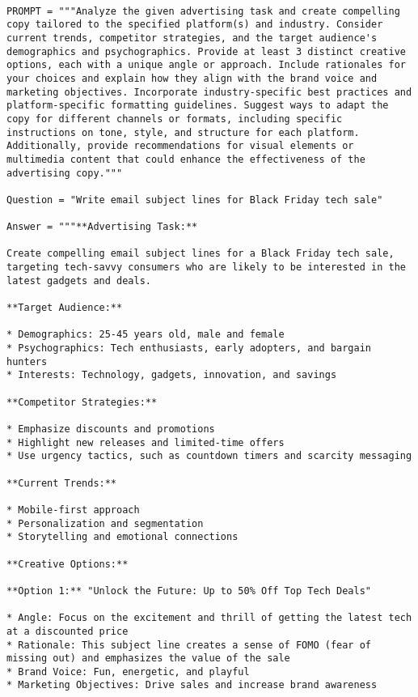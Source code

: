 \begin{tcolorbox}[title={\textbf{\small Performance After Optimization}}, boxrule=2pt, arc=0mm, breakable]
\begin{verbatim}

PROMPT = """Analyze the given advertising task and create compelling copy tailored to the specified platform(s) and industry. Consider current trends, competitor strategies, and the target audience's demographics and psychographics. Provide at least 3 distinct creative options, each with a unique angle or approach. Include rationales for your choices and explain how they align with the brand voice and marketing objectives. Incorporate industry-specific best practices and platform-specific formatting guidelines. Suggest ways to adapt the copy for different channels or formats, including specific instructions on tone, style, and structure for each platform. Additionally, provide recommendations for visual elements or multimedia content that could enhance the effectiveness of the advertising copy."""

Question = "Write email subject lines for Black Friday tech sale"

Answer = """**Advertising Task:**

Create compelling email subject lines for a Black Friday tech sale, targeting tech-savvy consumers who are likely to be interested in the latest gadgets and deals.

**Target Audience:**

* Demographics: 25-45 years old, male and female
* Psychographics: Tech enthusiasts, early adopters, and bargain hunters
* Interests: Technology, gadgets, innovation, and savings

**Competitor Strategies:**

* Emphasize discounts and promotions
* Highlight new releases and limited-time offers
* Use urgency tactics, such as countdown timers and scarcity messaging

**Current Trends:**

* Mobile-first approach
* Personalization and segmentation
* Storytelling and emotional connections

**Creative Options:**

**Option 1:** "Unlock the Future: Up to 50% Off Top Tech Deals"

* Angle: Focus on the excitement and thrill of getting the latest tech at a discounted price
* Rationale: This subject line creates a sense of FOMO (fear of missing out) and emphasizes the value of the sale
* Brand Voice: Fun, energetic, and playful
* Marketing Objectives: Drive sales and increase brand awareness


\end{verbatim}
\end{tcolorbox}
